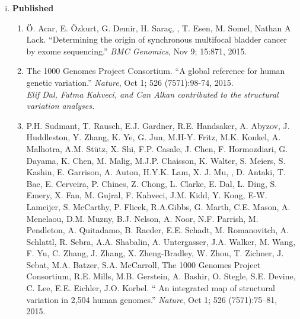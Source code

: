 % 

\begin{enumerate}[i)]
\item {\bf Published} %

\begin{enumerate}
  
  \item
  Ö. Acar, E. Özkurt, G. Demir, H. Saraç, \calkan{}, T. Esen, M. Somel, Nathan A Lack.
  ``Determining the origin of synchronous multifocal bladder cancer by exome sequencing.'' 
   {\em BMC Genomics}, Nov 9; 15:871, 2015.
  

  \item        
    The 1000 Genomes Project Consortium. ``A global reference for human genetic variation.'' {\em Nature}, Oct 1; 526 (7571):98-74, 2015.\\
    {\it Elif Dal, Fatma Kahveci, and Can Alkan contributed to the structural variation analyses.}

  \item        
  P.H. Sudmant, T. Rausch, E.J. Gardner,  R.E. Handsaker, A. Abyzov, J. Huddleston, Y. Zhang, K. Ye, G. Jun, M.H-Y. Fritz, M.K. Konkel, A. Malhotra, A.M. Stütz, X. Shi, F.P. Casale, J. Chen, 
  F. Hormozdiari, G. Dayama, K. Chen, M. Malig, M.J.P. Chaisson, K. Walter, S. Meiers, S. Kashin, E. Garrison, A. Auton, H.Y.K. Lam, X. J. Mu, \calkan, D. Antaki, T. Bae, E. Cerveira, P. Chines, Z. Chong, 
  L. Clarke, E. Dal, L. Ding, S. Emery, X. Fan, M. Gujral, F. Kahveci, J.M. Kidd, Y. Kong, E-W. Lameijer, S. McCarthy, P. Flicek, R.A.Gibbs, G. Marth, C.E. Mason, A. Menelaou, D.M. Muzny, 
  B.J. Nelson, A. Noor, N.F. Parrish, M. Pendleton, A. Quitadamo, B. Raeder, E.E. Schadt, M. Romanovitch, A. Schlattl, R. Sebra, A.A. Shabalin, A. Untergasser, 
  J.A. Walker, M. Wang, F. Yu, C. Zhang, J. Zhang, X. Zheng-Bradley, W. Zhou, T. Zichner, J. Sebat, M.A. Batzer, S.A. McCarroll, 
  The 1000 Genomes Project Consortium, R.E. Mills, M.B. Gerstein, A. Bashir, O. Stegle, S.E. Devine, C. Lee, E.E. Eichler, J.O. Korbel. 
  `` An integrated map of structural variation in 2,504 human genomes.''
  {\em Nature}, Oct 1; 526 (7571):75–81, 2015.


\end{enumerate}
\end{enumerate}
